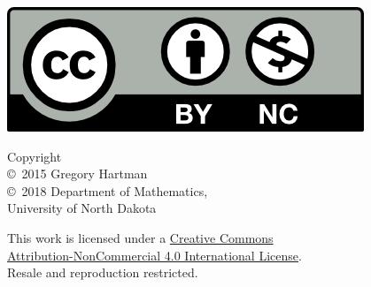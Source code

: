 
\noindent\hspace{-1in}\begin{minipage}{2in}
\href{http://creativecommons.org/licenses/by-nc/4.0/}{\includegraphics{figures/by-nc}}
\end{minipage}%
\begin{minipage}{3in}\raggedright
\noindent Copyright\\
\copyright~2015 Gregory Hartman\\
\copyright~2018 Department of Mathematics,\\
University of North Dakota

This work is licensed under a \href{http://creativecommons.org/licenses/by-nc/4.0/}{Creative Commons\\Attribution-NonCommercial 4.0 International License}.\\
Resale and reproduction restricted.
\end{minipage}

